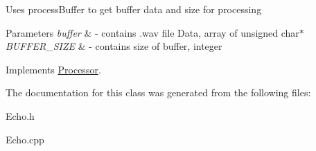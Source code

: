 Uses process\+Buffer to get buffer data and size for processing 
\begin{DoxyParams}{Parameters}
{\em buffer} & -\/ contains .wav file Data, array of unsigned char$\ast$ \\
\hline
{\em B\+U\+F\+F\+E\+R\+\_\+\+S\+I\+ZE} & -\/ contains size of buffer, integer \\
\hline
\end{DoxyParams}


Implements \hyperlink{classProcessor_a13e6240144c7a530079b0e2ae4a4526d}{Processor}.



The documentation for this class was generated from the following files\+:\begin{DoxyCompactItemize}
\item 
Echo.\+h\item 
Echo.\+cpp\end{DoxyCompactItemize}
